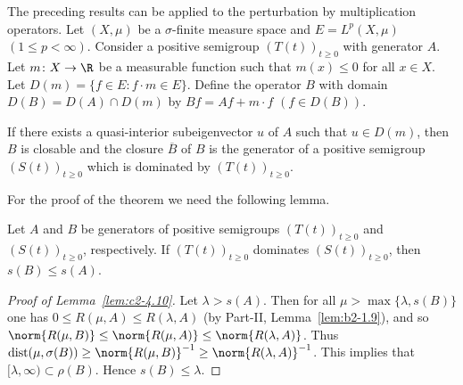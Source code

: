 The preceding results can be applied to the perturbation by multiplication operators. 
Let $(X,\mu)$ be a $\sigma$-finite measure space and $E = L^{p}(X,\mu)$ $(1 \leq p < \infty)$. 
Consider a positive semigroup $(T(t))_{t \geq 0}$ with generator $A$. 
Let $m \colon X \to \R$ be a measurable function such that $m(x) \leq 0$ for all $x \in X$. 
Let $D(m) = \{f \in E \colon f \cdot m \in E\}$. 
Define the operator $B$ with domain $D(B) = D(A) \cap D(m)$ by $Bf = Af + m \cdot f$ $(f \in D(B))$.
\begin{theorem}\label{thm:c2-4.9}
If there exists a quasi-interior subeigenvector $u$ of\/ $A$
such that $u \in D(m)$, then $B$ is closable and the closure $\overline{B}$ of\/ $B$ is the generator of a positive semigroup $(S(t))_{t \geq 0}$ which is dominated by $(T(t))_{t \geq 0}$.
\end{theorem}
For the proof of the theorem we need the following lemma.
\begin{lemma}\label{lem:c2-4.10}
Let $A$ and $B$ be generators of positive semigroups
$(T(t))_{t \geq 0}$ and $(S(t))_{t \geq 0}$, respectively.
If\/ $(T(t))_{t \geq 0}$ dominates
$(S(t))_{t \geq 0}$, then $s(B) \leq s(A)$.
\end{lemma}
\begin{proof}[Proof of Lemma~\ref{lem:c2-4.10}]
Let $\lambda > s(A)$.
Then for all $\mu > \max \{\lambda,s(B)\}$ one has $0 \leq R(\mu,A) \leq R(\lambda,A)$ 
(by Part-II, Lemma~\ref{lem:b2-1.9}), and so $\norm{R(\mu,B)} \leq  \norm{R(\mu,A)} \leq \norm{R(\lambda,A)}$.
Thus $\text{dist}(\mu,\sigma(B)) \geq \norm{R(\mu,B)}^{-1} \geq \norm{R(\lambda,A)}^{-1}$.
This implies that $[\lambda,\infty) \subset \rho(B)$.
Hence $s(B) \leq \lambda$.
\end{proof}
